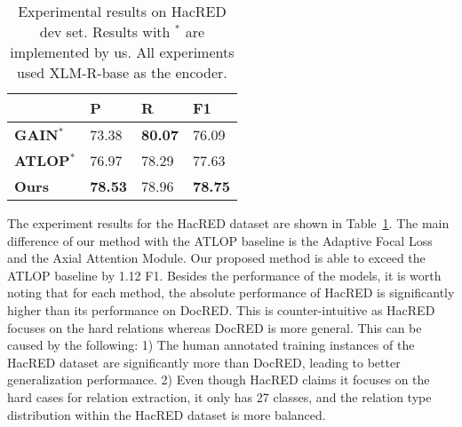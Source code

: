 \documentclass[11pt]{article}
\begin{document}
\begin{table}[ht]
\centering

\begin{tabular}{llll} 
\hline
~     & P     & R     & F1     \\ 
\hline
\textbf{GAIN}$^*$   & 73.38 & \textbf{80.07} & 76.09  \\
\textbf{ATLOP}$^*$ & 76.97 & 78.29 & 77.63  \\
\textbf{Ours}  & \textbf{78.53} & 78.96 & \textbf{78.75}  \\
\hline
\end{tabular}
\setlength{\abovecaptionskip}{2pt}
\caption{Experimental results on HacRED dev set. Results with $^*$ are implemented by us. All experiments used XLM-R-base as the encoder.}
\label{tab:hacred}
\end{table}

The experiment results for the HacRED dataset are shown in Table~\ref{tab:hacred}. The main difference of our method with the ATLOP baseline is the Adaptive Focal Loss and the Axial Attention Module. Our proposed method is able to exceed the ATLOP baseline by 1.12 F1. Besides the performance of the models, it is worth noting that for each method, the absolute performance of HacRED is significantly higher than its performance on DocRED. This is counter-intuitive as HacRED focuses on the hard relations whereas DocRED is more general. This can be caused by the following: 1) The human annotated training instances of the HacRED dataset are significantly more than DocRED, leading to better generalization performance. 2) Even though HacRED claims it focuses on the hard cases for relation extraction, it only has 27 classes, and the relation type distribution within the HacRED dataset is more balanced. 
\end{document}
